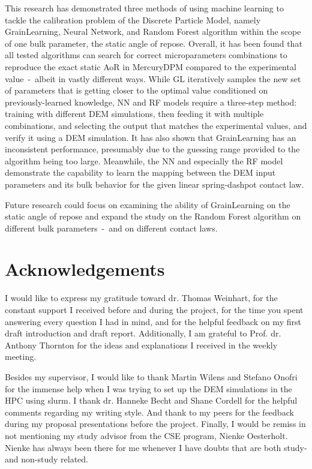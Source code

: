 This research has demonstrated three methods of using machine learning to tackle the calibration problem of the Discrete Particle Model, namely GrainLearning, Neural Network, and Random Forest algorithm within the scope of one bulk parameter, the static angle of repose. Overall, it has been found that all tested algorithms can search for correct microparameters combinations to reproduce the exact static AoR in MercuryDPM compared to the experimental value~-~albeit in vastly different ways. While GL iteratively samples the new set of parameters that is getting closer to the optimal value conditioned on previously-learned knowledge, NN and RF models require a three-step method: training with different DEM simulations, then feeding it with multiple combinations, and selecting the output that matches the experimental values, and verify it using a DEM simulation. It has also shown that GrainLearning has an inconsistent performance, presumably due to the guessing range provided to the algorithm being too large. Meanwhile, the NN and especially the RF model demonstrate the capability to learn the mapping between the DEM input parameters and its bulk behavior for the given linear spring-dashpot contact law. 

Future research could focus on examining the ability of GrainLearning on the static angle of repose and expand the study on the Random Forest algorithm on different bulk parameters~-~and on different contact laws. 

\section{Acknowledgements}

I would like to express my gratitude toward dr. Thomas Weinhart, for the constant support I received before and during the project, for the time you spent answering every question I had in mind, and for the helpful feedback on my first draft introduction and draft report. Additionally, I am grateful to Prof. dr. Anthony Thornton for the ideas and explanations I received in the weekly meeting. 

Besides my supervisor, I would like to thank Martin Wilens and Stefano Onofri for the immense help when I was trying to set up the DEM simulations in the HPC using slurm. I thank dr. Hanneke Becht and Shane Cordell for the helpful comments regarding my writing style. And thank to my peers for the feedback during my proposal presentations before the project. 
Finally, I would be remiss in not mentioning my study advisor from the CSE program, Nienke Oesterholt. Nienke has always been there for me whenever I have doubts that are both study- and non-study related. 
